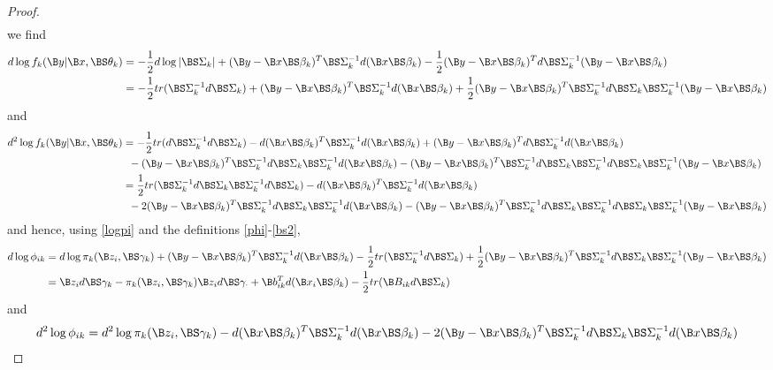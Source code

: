 \begin{proof}
\begin{align*}
\end{align*}
we find 
\begin{align*}
d\log f_{k}(\B y|\B x,\BS\theta_{k})&=-\frac{1}{2}d\log|\BS\Sigma_{k}|+(\B y-\B x\BS \beta_{k})^{T}\BS\Sigma_{k}^{-1}d(\B x\BS \beta_{k})-\frac{1}{2}(\B y-\B x\BS \beta_{k})^{T}d\BS\Sigma_{k}^{-1}(\B y-\B x\BS\beta_{k})\\
&=-\frac{1}{2}tr(\BS\Sigma_{k}^{-1}d\BS\Sigma_{k})+(\B y-\B x\BS \beta_{k})^{T}\BS\Sigma_{k}^{-1}d(\B x\BS \beta_{k})+\frac{1}{2}(\B y-\B x\BS \beta_{k})^{T}\BS\Sigma_{k}^{-1}d\BS\Sigma_{k}\BS\Sigma_{k}^{-1}(\B y-\B x\BS\beta_{k})\\
\end{align*}
and
\begin{align*}
d^{2}\log f_{k}(\B y|\B x,\BS\theta_{k})&=-\frac{1}{2}tr(d\BS\Sigma_{k}^{-1}d\BS\Sigma_{k})-d(\B x\BS \beta_{k})^{T}\BS\Sigma_{k}^{-1}d(\B x\BS \beta_{k})+(\B y-\B x\BS \beta_{k})^{T}d\BS\Sigma_{k}^{-1}d(\B x\BS \beta_{k})\\
&\;\;-(\B y-\B x\BS \beta_{k})^{T}\BS\Sigma_{k}^{-1}d\BS\Sigma_{k}\BS\Sigma_{k}^{-1}d(\B x\BS\beta_{k})-(\B y-\B x\BS \beta_{k})^{T}\BS\Sigma_{k}^{-1}d\BS\Sigma_{k}\BS\Sigma_{k}^{-1}d\BS\Sigma_{k}\BS\Sigma_{k}^{-1}(\B y-\B x\BS\beta_{k})\\
&=\frac{1}{2}tr(\BS\Sigma_{k}^{-1}d\BS\Sigma_{k}\BS\Sigma_{k}^{-1}d\BS\Sigma_{k})-d(\B x\BS \beta_{k})^{T}\BS\Sigma_{k}^{-1}d(\B x\BS \beta_{k})\\
&\;\;-2(\B y-\B x\BS \beta_{k})^{T}\BS\Sigma_{k}^{-1}d\BS\Sigma_{k}\BS\Sigma_{k}^{-1}d(\B x\BS\beta_{k})-(\B y-\B x\BS \beta_{k})^{T}\BS\Sigma_{k}^{-1}d\BS\Sigma_{k}\BS\Sigma_{k}^{-1}d\BS\Sigma_{k}\BS\Sigma_{k}^{-1}(\B y-\B x\BS\beta_{k})\\
\end{align*}
and hence, using \eqref{logpi} and the definitions \eqref{phi}-\eqref{bs2},
\begin{align}
d\log \phi_{ik}&=d\log \pi_{k}(\B z_{i},\BS\gamma_k)+(\B y-\B x\BS \beta_{k})^{T}\BS\Sigma_{k}^{-1}d(\B x\BS \beta_{k})-\frac{1}{2}tr(\BS\Sigma_{k}^{-1}d\BS\Sigma_{k})+\frac{1}{2}(\B y-\B x\BS \beta_{k})^{T}\BS\Sigma_{k}^{-1}d\BS\Sigma_{k}\BS\Sigma_{k}^{-1}(\B y-\B x\BS\beta_{k})\nonumber\\
&=\B z_{i} d\BS \gamma_{k} -\pi_{k}(\B z_{i},\BS\gamma_k)\B z_{i}d\BS\gamma_{\cdot}+\B b^{T}_{ik}d(\B x_{i}\BS \beta_{k})-\frac{1}{2}tr(\B B_{ik}d\BS\Sigma_{k})\nonumber
\end{align}
and
\begin{align}
d^{2}\log \phi_{ik}&=d^{2}\log \pi_{k}(\B z_{i},\BS\gamma_k)-d(\B x\BS \beta_{k})^{T}\BS\Sigma_{k}^{-1}d(\B x\BS \beta_{k})-2(\B y-\B x\BS \beta_{k})^{T}\BS\Sigma_{k}^{-1}d\BS\Sigma_{k}\BS\Sigma_{k}^{-1}d(\B x\BS\beta_{k})\nonumber\\

\end{align}
\end{proof}
